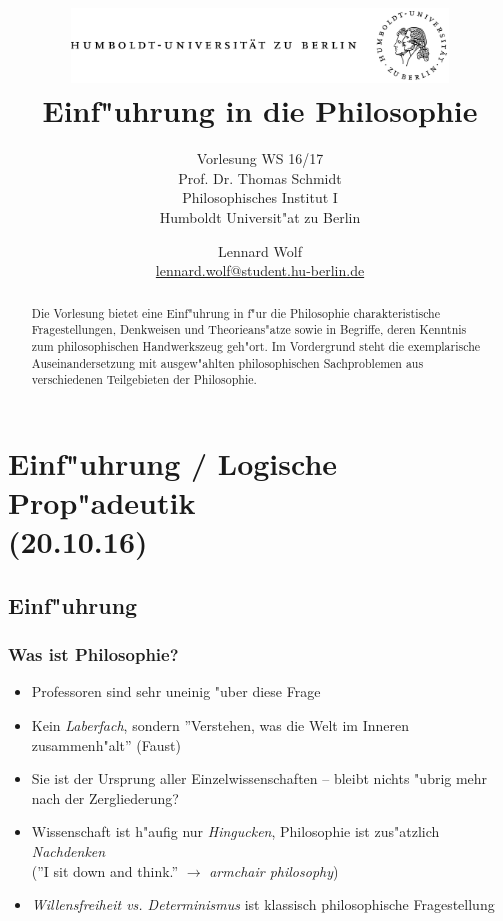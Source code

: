 \documentclass[emulatestandardclasses]{scrartcl}
\date{\vspace{-3ex}}
\begin{document}
\title{
	\includegraphics*[width=0.75\textwidth]{images/hu_logo.png}\\
	\vspace{24pt}
	Einf"uhrung in die Philosophie}
\subtitle{Vorlesung WS 16/17\\
          Prof. Dr. Thomas Schmidt\\
          Philosophisches Institut I \\ 
          Humboldt Universit"at zu Berlin}
\author{Lennard Wolf\\
        \small{\href{mailto:lennard.wolf@student.hu-berlin.de}{lennard.wolf@student.hu-berlin.de}}}
\maketitle
\begin{abstract}

Die Vorlesung bietet eine Einf"uhrung in f"ur die Philosophie charakteristische Fragestellungen, Denkweisen und Theorieans"atze sowie in Begriffe, deren Kenntnis zum philosophischen Handwerkszeug geh"ort. Im Vordergrund steht die exemplarische Auseinandersetzung mit ausgew"ahlten philosophischen Sachproblemen aus verschiedenen Teilgebieten der Philosophie.

\end{abstract}
\newpage

\tableofcontents
\listoffigures
\newpage


\section{Einf"uhrung / Logische Prop"adeutik\\(20.10.16)}

\subsection{Einf"uhrung}
\subsubsection{Was ist Philosophie?}

\begin{itemize}
  \item Professoren sind sehr uneinig "uber diese Frage
  \item Kein \emph{Laberfach}, sondern ''Verstehen, was die Welt im Inneren zusammenh"alt'' (Faust)
  \item Sie ist der Ursprung aller Einzelwissenschaften -- bleibt nichts "ubrig mehr nach der Zergliederung?
  \item Wissenschaft ist h"aufig nur \emph{Hingucken}, Philosophie ist zus"atzlich \emph{Nachdenken}\\(''I sit down and think.'' $\rightarrow$ \emph{armchair philosophy})
  \item \emph{Willensfreiheit vs. Determinismus} ist klassisch philosophische Fragestellung
\end{itemize}
\end{document}
